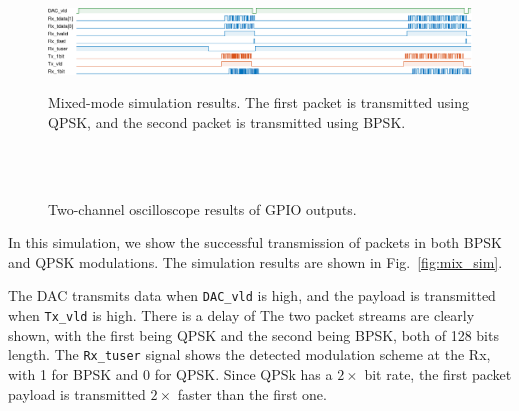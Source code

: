 \documentclass[journal,twoside]{IEEEtran}
\begin{document}
      \begin{figure}
        \includegraphics{_tikz_sim_MIX-crop.pdf}
        \caption{Mixed-mode simulation results.
          The first packet is transmitted using QPSK, and the second packet is transmitted using BPSK.}
        \label{fig:mix_sim}
        \\
        \\
        \caption{Two-channel oscilloscope results of GPIO outputs.}
        \label{fig:scope}
      \end{figure}

      In this simulation, we show the successful transmission of packets in both BPSK and QPSK modulations.
      The simulation results are shown in Fig.~\ref{fig:mix_sim}.

      The DAC transmits data when \texttt{DAC\_vld} is high,
      and the payload is transmitted when \texttt{Tx\_vld} is high.
      There is a delay of 
      The two packet streams are clearly shown,
      with the first being QPSK and the second being BPSK, both of 128 bits length.
      The \texttt{Rx\_tuser} signal shows the detected modulation scheme at the Rx, with 1 for BPSK and 0 for QPSK.
      Since QPSk has a $2\times$ bit rate, the first packet payload is transmitted $2\times$ faster than the first one.
\end{document}
